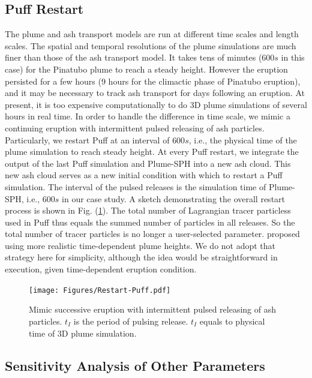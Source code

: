 \documentclass[draft,linenumbers]{agujournal2019}
\begin{document}
\subsection{Puff Restart}

The plume and ash transport models are run at different time scales and length scales.  The spatial and temporal resolutions of the plume simulations are much finer than those of the ash transport model. It takes tens of minutes ($600 s$ in this case) for the Pinatubo plume to reach a steady height. However the eruption persisted for a few hours (9 hours for the climactic phase of Pinatubo eruption), and it may be necessary to track ash transport for days following an eruption.  At present, it is too expensive computationally to do 3D plume simulations of several hours in real time. In order to handle the difference in time scale, we mimic a continuing eruption with intermittent pulsed releasing of ash particles. Particularly, we restart Puff at an interval of $600 s$, i.e., the physical time of the plume simulation to reach steady height. At every Puff restart, we integrate the output of the last Puff simulation and Plume-SPH into a new ash cloud. This new ash cloud serves as a new initial condition with which to restart a Puff simulation. The interval of the pulsed releases is the simulation time of Plume-SPH, i.e., $600 s$ in our case study. A sketch demonstrating the overall restart process is shown in Fig. (\ref{fig:Restart-Puff}). The total number of Lagrangian tracer particless used in Puff thus equals the summed number of particles in all releases. So the total number of tracer particles is no longer a user-selected parameter.  
\citet{fero2008simulation} proposed using more realistic time-dependent plume heights. We do not adopt that strategy here for simplicity, although the idea would be straightforward in execution, given time-dependent eruption condition. 

\begin{figure}
\center
\texttt{[image: Figures/Restart-Puff.pdf]} 
    \caption{Mimic successive eruption with intermittent pulsed releasing of ash particles. $t_I$ is the period of pulsing release. $t_I$ equals to physical time of 3D plume simulation.}
    \label{fig:Restart-Puff}
\end{figure}

\subsection{Sensitivity Analysis of Other Parameters}
\end{document}

